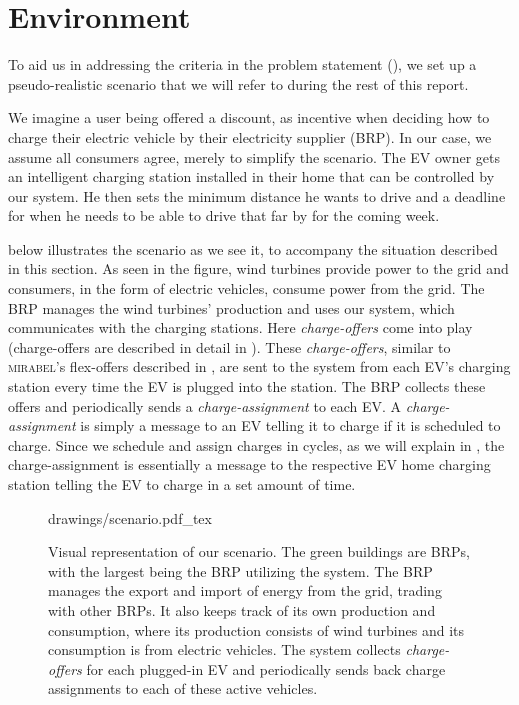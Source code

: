 \section{Environment}\label{sec:scenario}
To aid us in addressing the criteria in the problem statement (), we set up a pseudo-realistic scenario that we will refer to during the rest of this report.

We imagine a user being offered a discount, as incentive when deciding how to charge their electric vehicle by their electricity supplier (BRP). In our case, we assume all consumers agree, merely to simplify the scenario. The EV owner gets an intelligent charging station installed in their home that can be controlled by our system. He then sets the minimum distance he wants to drive and a deadline for when he needs to be able to drive that far by for the coming week.

 below illustrates the scenario as we see it, to accompany the situation described in this section. As seen in the figure, wind turbines provide power to the grid and consumers, in the form of electric vehicles, consume power from the grid. The BRP manages the wind turbines' production and uses our system, which communicates with the charging stations. Here \emph{charge-offers} come into play (charge-offers are described in detail in ). These \emph{charge-offers}, similar to \textsc{mirabel}'s flex-offers described in , are sent to the system from each EV's charging station every time the EV is plugged into the station. The BRP collects these offers and periodically sends a \emph{charge-assignment} to each EV. A \emph{charge-assignment} is simply a message to an EV telling it to charge if it is scheduled to charge. Since we schedule and assign charges in cycles, as we will explain in , the charge-assignment is essentially a message to the respective EV home charging station telling  the EV to charge in a set amount of time.

\begin{figure}[htpb] 
  \centering
  \def\svgwidth{\textwidth}
  {drawings/scenario.pdf_tex}
  \caption{Visual representation of our scenario. The green buildings are BRPs, with the largest being the BRP utilizing the system. The BRP manages the export and import of energy from the grid, trading with other BRPs. It also keeps track of its own production and consumption, where its production consists of wind turbines and its consumption is from electric vehicles. The system collects \emph{charge-offers} for each plugged-in EV and periodically sends back charge assignments to each of these active vehicles.}
  \label{fig:scenario}
\end{figure}

